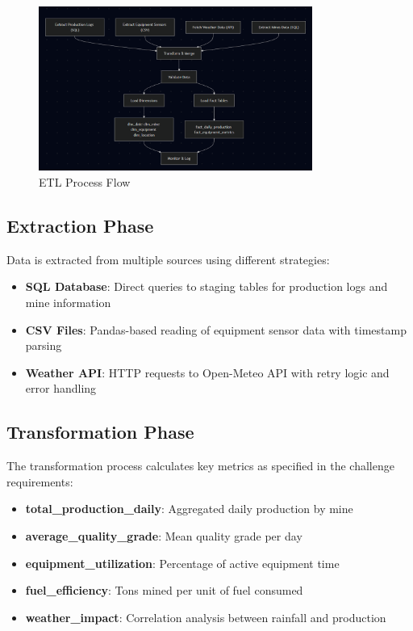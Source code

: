 \documentclass[11pt]{article}
\begin{document}
\begin{figure}[H]
\centering
\includegraphics[width=0.8\textwidth]{assets/ETL_Flow.png}
\caption{ETL Process Flow}
\label{fig:etl_flow}
\end{figure}

\subsection{Extraction Phase}
Data is extracted from multiple sources using different strategies:
\begin{itemize}
    \item \textbf{SQL Database}: Direct queries to staging tables for production logs and mine information
    \item \textbf{CSV Files}: Pandas-based reading of equipment sensor data with timestamp parsing
    \item \textbf{Weather API}: HTTP requests to Open-Meteo API with retry logic and error handling
\end{itemize}

\subsection{Transformation Phase}
The transformation process calculates key metrics as specified in the challenge requirements:
\begin{itemize}
    \item \textbf{total\_production\_daily}: Aggregated daily production by mine
    \item \textbf{average\_quality\_grade}: Mean quality grade per day
    \item \textbf{equipment\_utilization}: Percentage of active equipment time
    \item \textbf{fuel\_efficiency}: Tons mined per unit of fuel consumed
    \item \textbf{weather\_impact}: Correlation analysis between rainfall and production
\end{itemize}
\end{document}
